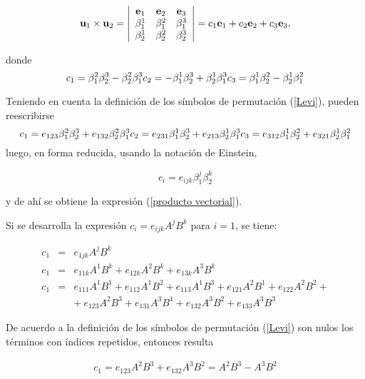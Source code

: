 \[
\bold{u}_1 \times\bold{u}_2=\left  | \begin{array}{ccc}
\bold{e}_1  & \bold{e}_2  & \bold{e}_3 \\
\beta_1^1 &  \beta_1^2  &  \beta_1^3 \\
\beta_2^1 &  \beta_2^2  &  \beta_2^3 
\end{array}
\right|=c_1 \bold{e}_1 + c_2 \bold{e}_2  + c_3 \bold{e}_3,
\]

\bigskip
\noindent
donde 
\[
c_1 = \beta_1^2 \beta_2^3 - \beta_2^2  \beta_1^3 \\
c_2 = - \beta_1^1  \beta_2^3  +  \beta_2^1   \beta_1^3  \\
c_3= \beta_1^1  \beta_2^2  - \beta_2^1  \beta_1^2  
\]

Teniendo en cuenta la definición de los símbolos de permutación (\ref{Levi}),  pueden reescribirse 
\[
c_1=e_{123} \beta_1^2 \beta_2^3  + e_{132} \beta_2^2 \beta_1^3 \\
c_2 = e_{231} \beta_1^1  \beta_2^3  + e_{213} \beta_2^1   \beta_1^3  \\
c_3=   e_{312} \beta_1^1  \beta_2^2 +  e_{321} \beta_2^1  \beta_1^2  
\]
luego, en forma reducida, usando la notación de Einstein,


$$c_i=e_{ijk} \beta_1^j \beta_2^k$$  

\noindent
y de ahí se obtiene la expresión (\ref{producto vectorial}).






\bigskip

\begin{example}


Si se desarrolla la expresión $c_i=e_{ijk} A^j B^k $ para $i=1$, se tiene:

\bigskip

\begin{eqnarray*}
c_1&=&e_{1jk} A^j B^k \\
c_1&=& e_{11k} A^1 B^k + e_{12k} A^2 B^k + e_{13k} A^3 B^k \\
c_1&=& e_{111} A^1 B^1 + e_{112} A^1 B^2 + e_{113} A^1 B^3 +  e_{121} A^2 B^1 + e_{122} A^2 B^2 +\\
 &&  + ~ e_{123} A^2 B^3 +    e_{131} A^3 B^1  + e_{132} A^3 B^2  + e_{133} A^3 B^3
\end{eqnarray*}


\bigskip

De acuerdo a la definición de los símbolos de permutación (\ref{Levi}) son nulos los términos con índices repetidos, entonces resulta


\begin{eqnarray*}
c_1=e_{123} A^2 B^3 + e_{132} A^3 B^2= A^2 B^3 - A^3 B^2 
\end{eqnarray*}
\end{example}


